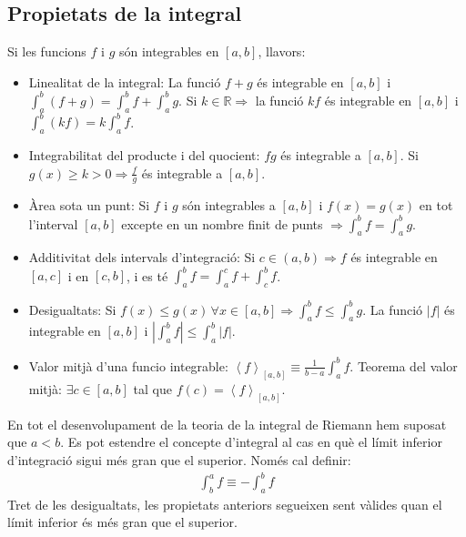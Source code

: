 \subsection{Propietats de la integral}
Si les funcions $f$ i $g$ són integrables en $[a , b]$, llavors:
\begin{itemize}
    \item Linealitat de la integral:
        \subitem La funció $f + g$ és integrable en $[a , b]$ i $\int_{a}^{b} (f + g) = \int_{a}^{b} f + \int_{a}^{b} g$.
        \subitem Si $k \in \mathbb{R} \Rightarrow$ la funció $k f$ és integrable en $[a , b]$ i $\int_{a}^{b} (k f) = k \int_{a}^{b} f$.
    \item Integrabilitat del producte i del quocient:
        \subitem $fg$ és integrable a $[a , b]$.
        \subitem Si $g(x) \geq k > 0 \Rightarrow \frac{f}{g}$ és integrable a $[a , b]$.
    \item Àrea sota un punt:
        \subitem Si $f$ i $g$ són integrables a $[a , b]$ i $f(x) = g(x)$ en tot l'interval $[a , b]$ excepte en un nombre finit de punts $\Rightarrow \int_{a}^{b} f = \int_{a}^{b} g$.
    \item Additivitat dels intervals d'integració:
        \subitem Si $c \in (a , b) \Rightarrow f$ és integrable en $[a , c]$ i en $[c , b]$, i es té $\int_{a}^{b} f = \int_{a}^{c} f + \int_{c}^{b} f$.
    \item Desigualtats:
        \subitem Si $f(x) \leq g(x) \, \forall x \in [a , b] \Rightarrow \int_{a}^{b} f \leq \int_{a}^{b} g$.
        \subitem La funció $|f|$ és integrable en $[a , b]$ i $|\int_{a}^{b} f| \leq \int_{a}^{b} |f|$.
    \item Valor mitjà d'una funcio integrable:
        \subitem $\left< f \right>_{[a , b]} \equiv \frac{1}{b-a} \int_{a}^{b} f$.
        \subitem Teorema del valor mitjà: $\exists c \in [a , b]$ tal que $f(c) = \left< f \right>_{[a , b]}$.
\end{itemize}
En tot el desenvolupament de la teoria de la integral de Riemann hem suposat que $a < b$. Es pot estendre el concepte d'integral al cas en què el límit inferior d'integració sigui més gran que el superior. Només cal definir:
\begin{align}
    \int_{b}^{a} f \equiv - \int_{a}^{b} f
\end{align}
Tret de les desigualtats, les propietats anteriors segueixen sent vàlides quan el límit inferior és més gran que el superior.
    
